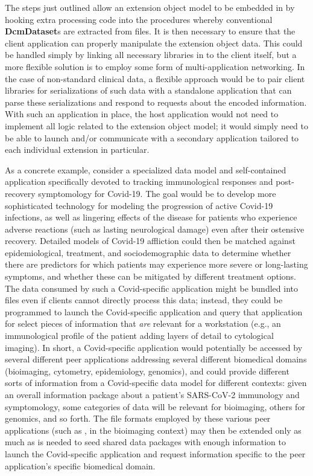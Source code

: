 \documentclass[11pt,letterpaper]{article}
\newcommand{\DCMTK}{\resizebox{!}{7pt}{\AcronymText{DCMTK}}}
\newcommand{\DICOM}{\resizebox{!}{7pt}{\AcronymText{DICOM}}}
\newcommand{\textscc}[1]{{\color{orr!35!black}{{%
						\fontfamily{Cabin-TLF}\fontseries{b}\selectfont{\textsc{\scriptsize{#1}}}}}}}
\newcommand{\AcronymText}[1]{{\textscc{#1}}}
\newcommand{\p}[1]{

\vspace{.75em}#1}
\begin{document}
{\p{The steps just outlined allow an extension object model to 
be embedded in \DICOM{} by hooking extra processing code 
into the procedures whereby conventional \textbf{DcmDataset}s  
are extracted from \DICOM{} files.  It is then necessary to 
ensure that the \DICOM{} client application can properly 
manipulate the extension object data.  This could be handled 
simply by linking all necessary libraries in to the \DICOM{} client 
itself, but a more flexible solution is to employ some 
form of multi-application networking.  In the case 
of non-standard clinical data, a flexible approach would be 
to pair client libraries for serializations of such data 
with a standalone application that can parse these 
serializations and respond to requests about the encoded 
information.  With such an application in place, the 
\DCMTK{} host application would not need to implement 
all logic related to the extension object model; it 
would simply need to be able to launch and/or communicate 
with a secondary application tailored to each individual extension 
in particular.}

\p{As a concrete example, consider a specialized data model and 
self-contained application specifically devoted to tracking 
immunological responses and post-recovery symptomology 
for Covid-19.  The goal would be to develop more sophisticated 
technology for modeling the progression of active Covid-19 
infections, as well as lingering effects of the disease 
for patients who experience adverse reactions (such 
as lasting neurological damage) even after their ostensive 
recovery.  Detailed models of Covid-19 affliction could then 
be matched against epidemiological, treatment, and sociodemographic 
data to determine whether there are predictors for which 
patients may experience more severe or long-lasting symptoms, 
and whether these can be mitigated by different treatment 
options.  The data consumed by such a Covid-specific application 
might be bundled into \DICOM{} files even if \DICOM{} clients 
cannot directly process this data; instead, they could be 
programmed to launch the Covid-specific application and 
query that application for select pieces of information 
that \textit{are} relevant for a \DICOM{} workstation 
(e.g., an immunological profile of the patient adding 
layers of detail to cytological imaging).  In short, 
a Covid-specific application would potentially be accessed by 
several different peer applications addressing 
several different biomedical domains (bioimaging, cytometry, 
epidemiology, genomics), and could provide different 
sorts of information from a Covid-specific data model 
for different contexts: given an overall information 
package about a patient's SARS-CoV-2 immunology and symptomology, 
some categories of data will be relevant for bioimaging, 
others for genomics, and so forth.  The file formats employed by 
these various peer applications (such as \DICOM{}, in the 
bioimaging context) may then be extended only as much 
as is needed to seed shared data packages with enough 
information to launch the Covid-specific application and 
request information specific to the peer application's 
specific biomedical domain.}

}
\end{document}
